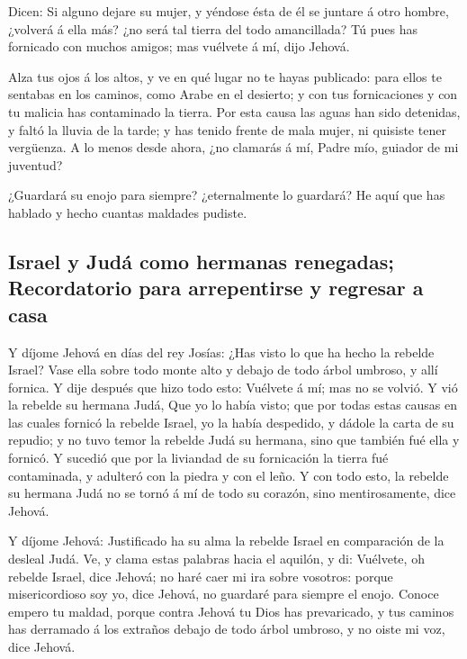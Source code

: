  Dicen: Si alguno dejare su mujer, y yéndose ésta de él se
juntare á otro hombre, ¿volverá á ella más? ¿no será tal tierra del todo
amancillada? Tú pues has fornicado con muchos amigos; mas vuélvete á mí,
dijo Jehová.

 Alza tus ojos á los altos, y ve en qué lugar no te hayas
publicado: para ellos te sentabas en los caminos, como Arabe en el
desierto; y con tus fornicaciones y con tu malicia has contaminado la
tierra.  Por esta causa las aguas han sido detenidas, y
faltó la lluvia de la tarde; y has tenido frente de mala mujer, ni
quisiste tener vergüenza.  A lo menos desde ahora, ¿no
clamarás á mí, Padre mío, guiador de mi juventud?

 ¿Guardará su enojo para siempre? ¿eternalmente lo
guardará? He aquí que has hablado y hecho cuantas maldades pudiste.

\hypertarget{israel-y-juduxe1-como-hermanas-renegadas-recordatorio-para-arrepentirse-y-regresar-a-casa}{%
\subsection{Israel y Judá como hermanas renegadas; Recordatorio para
arrepentirse y regresar a
casa}\label{israel-y-juduxe1-como-hermanas-renegadas-recordatorio-para-arrepentirse-y-regresar-a-casa}}

 Y díjome Jehová en días del rey Josías: ¿Has visto lo que
ha hecho la rebelde Israel? Vase ella sobre todo monte alto y debajo de
todo árbol umbroso, y allí fornica.  Y dije después que
hizo todo esto: Vuélvete á mí; mas no se volvió. Y vió la rebelde su
hermana Judá,  Que yo lo había visto; que por todas estas
causas en las cuales fornicó la rebelde Israel, yo la había despedido, y
dádole la carta de su repudio; y no tuvo temor la rebelde Judá su
hermana, sino que también fué ella y fornicó.  Y sucedió
que por la liviandad de su fornicación la tierra fué contaminada, y
adulteró con la piedra y con el leño.  Y con todo esto,
la rebelde su hermana Judá no se tornó á mí de todo su corazón, sino
mentirosamente, dice Jehová.

 Y díjome Jehová: Justificado ha su alma la rebelde
Israel en comparación de la desleal Judá.  Ve, y clama
estas palabras hacia el aquilón, y di: Vuélvete, oh rebelde Israel, dice
Jehová; no haré caer mi ira sobre vosotros: porque misericordioso soy
yo, dice Jehová, no guardaré para siempre el enojo. 
Conoce empero tu maldad, porque contra Jehová tu Dios has prevaricado, y
tus caminos has derramado á los extraños debajo de todo árbol umbroso, y
no oiste mi voz, dice Jehová.

